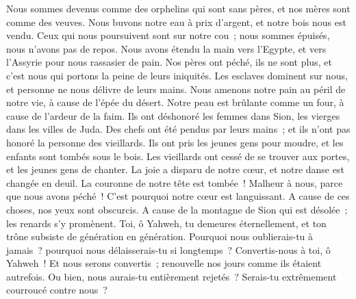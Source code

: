 \begin{multicols}{2}
Nous sommes devenus comme des orphelins qui sont sans pères, et nos mères sont comme des veuves.
Nous buvons notre eau à prix d'argent, et notre bois nous est vendu.
Ceux qui nous poursuivent sont sur notre cou~; nous sommes épuisés, nous n'avons pas de repos.
Nous avons étendu la main vers l'Egypte, et vers l'Assyrie pour nous rassasier de pain.
Nos pères ont péché, ils ne sont plus, et c'est nous qui portons la peine de leurs iniquités.
Les esclaves dominent sur nous, et personne ne nous délivre de leurs mains.
Nous amenons notre pain au péril de notre vie, à cause de l'épée du désert.
Notre peau est brûlante comme un four, à cause de l'ardeur de la faim.
Ils ont déshonoré les femmes dans Sion, les vierges dans les villes de Juda.
Des chefs ont été pendus par leurs mains~; et ils n'ont pas honoré la personne des vieillards.
Ils ont pris les jeunes gens pour moudre, et les enfants sont tombés sous le bois.
Les vieillards ont cessé de se trouver aux portes, et les jeunes gens de chanter.
La joie a disparu de notre cœur, et notre danse est changée en deuil.
La couronne de notre tête est tombée~! Malheur à nous, parce que nous avons péché~!
C'est pourquoi notre cœur est languissant. A cause de ces choses, nos yeux sont obscurcis.
A cause de la montagne de Sion qui est désolée~; les renards s'y promènent.
Toi, ô Yahweh, tu demeures éternellement, et ton trône subsiste de génération en génération.
Pourquoi nous oublierais-tu à jamais~? pourquoi nous délaisserais-tu si longtemps~?
Convertis-nous à toi, ô Yahweh~! Et nous serons convertis~; renouvelle nos jours comme ils étaient autrefois.
Ou bien, nous aurais-tu entièrement rejetés~? Serais-tu extrêmement courroucé contre nous~?
\PPE{}
\end{multicols}
